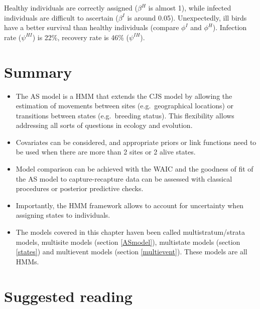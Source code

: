 \documentclass[
  12pt,
]{krantz}
\begin{document}
Healthy individuals are correctly assigned (\(\beta^H\) is almost 1), while infected individuals are difficult to ascertain (\(\beta^I\) is around 0.05). Unexpectedly, ill birds have a better survival than healthy individuals (compare \(\phi^I\) and \(\phi^H\)). Infection rate (\(\psi^{HI}\)) is 22\%, recovery rate is 46\% (\(\psi^{IH}\)).

\section{Summary}\label{summary-4}

\begin{itemize}
\item
  The AS model is a HMM that extends the CJS model by allowing the estimation of movements between sites (e.g.~geographical locations) or transitions between states (e.g.~breeding status). This flexibility allows addressing all sorts of questions in ecology and evolution.
\item
  Covariates can be considered, and appropriate priors or link functions need to be used when there are more than 2 sites or 2 alive states.
\item
  Model comparison can be achieved with the WAIC and the goodness of fit of the AS model to capture-recapture data can be assessed with classical procedures or posterior predictive checks.
\item
  Importantly, the HMM framework allows to account for uncertainty when assigning states to individuals.
\item
  The models covered in this chapter haven been called multistratum/strata models, multisite models (section \ref{ASmodel}), multistate models (section \ref{states}) and multievent models (section \ref{multievent}). These models are all HMMs.
\end{itemize}

\section{Suggested reading}\label{suggested-reading-4}
\end{document}
